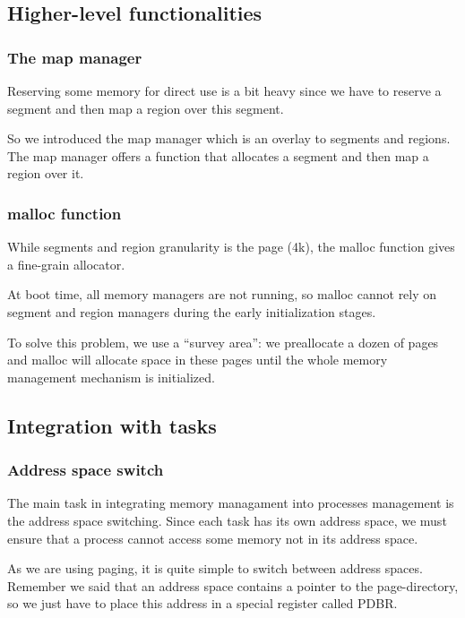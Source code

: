 \subsection{Higher-level functionalities}


\begin{frame}
  \frametitle{The map manager}

  Reserving some memory for direct use is a bit heavy since we have to
  reserve a segment and then map a region over this segment.

  \-

  So we introduced the map manager which is an overlay to segments and
  regions. The map manager offers  a function that allocates a segment
  and then map a region over it.

\end{frame}


\begin{frame}
  \frametitle{malloc function}

  While segments and  region granularity is the page  (4k), the malloc
  function gives a fine-grain allocator.

  \-

  At boot time, all memory  managers are not running, so malloc cannot
  rely on segment and  region managers during the early initialization
  stages.

  \-

  To solve  this problem, we use  a ``survey area'':  we preallocate a
  dozen of pages  and malloc will allocate space  in these pages until
  the whole memory management mechanism is initialized.

\end{frame}

%
%

\subsection{Integration with tasks}


\begin{frame}
  \frametitle{Address space switch}

  The  main  task  in  integrating memory  managament  into  processes
  management is the  address space switching. Since each  task has its
  own address space, we must  ensure that a process cannot access some
  memory not in its address space.

  \-

  As we are using paging, it is quite simple to switch between address
  spaces. Remember we said that an address space contains a pointer to
  the  page-directory, so  we just  have to  place this  address  in a
  special register called PDBR.

\end{frame}

